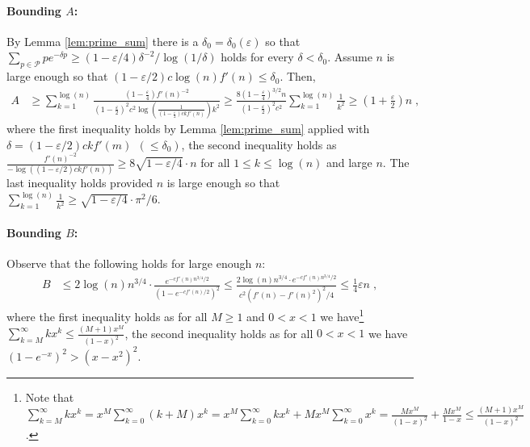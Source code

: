 \documentclass[11pt]{article}
\theoremstyle{plain}
\begin{document}
\paragraph{Bounding $A$:}
By Lemma \ref{lem:prime_sum} there is a $\delta_0=\delta_0(\varepsilon)$ so that $\sum_{p\in \mathcal{P}}pe^{-\delta p} \geq  {(1-\varepsilon/4)\delta^{-2}}/{\log(1/\delta)}$ holds for every $\delta < \delta_0$.
Assume $n$ is large enough so that $(1-\varepsilon/2)c  \log(n) f'(n)\leq \delta_0$. Then,
\begin{align*}
     A&\geq  \sum_{k=1}^{\log(n)} \frac{(1-\frac{\varepsilon}{4})f'(n)^{-2}}{(1-\frac{\varepsilon}{2})^2c^2 \log\left(\frac{1}{(1-\frac{\varepsilon}{2})c k f'(n)}\right)k^2} \geq \frac{8(1-\frac{\varepsilon}{4})^{3/2}n}{(1-\frac{\varepsilon}{2})^2c^2}\sum_{k=1}^{\log(n)} \frac{1}{k^2} \geq \left(1+\frac{\varepsilon}{2}\right)n\;,
\end{align*}
where the first inequality holds by Lemma \ref{lem:prime_sum} applied with $\delta=(1-\varepsilon/2)c k f'(m) ~~(\leq \delta_0)$, the second inequality holds as $\frac{f'(n)^{-2}}{-\log\left({(1-\varepsilon/2)c k f'(n)}\right)}\geq 8\sqrt{1-\varepsilon/4} \cdot n$ for all $1\leq k\leq \log(n)$ and large $n$. The last inequality holds provided $n$ is large enough so that $\sum_{k=1}^{\log(n)}\frac{1}{k^2}\geq \sqrt{1-\varepsilon/4}\cdot \pi^2/6$.

\paragraph{Bounding $B$:}
Observe that the following holds for large enough $n$:
\begin{align*}
    B&\leq 2\log(n)n^{3/4}\cdot \frac{e^{- c f'(n) n^{3/4}/2}}{\left(1-e^{-cf'(n)/2}\right)^2}\leq  \frac{ 2\log(n) n^{3/4} \cdot e^{-cf'(n) n^{3/4}/2}}{c^2\left(f'(n)-f'(n)^2\right)^2/4} \leq \frac{1}{4}\varepsilon n\;,
\end{align*}
where the first inequality holds as for all $M\geq 1$ and $0<x<1$ we have\footnote{Note that $\sum_{k=M}^{\infty} k x^{k} = x^{M}\sum_{k=0}^{\infty}(k+M)x^{k} =x^{M}\sum_{k=0}^{\infty}kx^{k} + Mx^{M}\sum_{k=0}^{\infty}x^{k} = \frac{Mx^{M}}{(1-x)^{2}}+\frac{Mx^{M}}{1-x}  \leq \frac{(M+1)x^M}{(1-x)^2}$.} $\sum_{k=M}^{\infty} k x^{k}\leq \frac{(M+1)x^{M}}{(1-x)^2}$, the second inequality holds as for all $0<x<1$ we have $(1-e^{-x})^2>(x-x^2)^2$.
\end{document}
